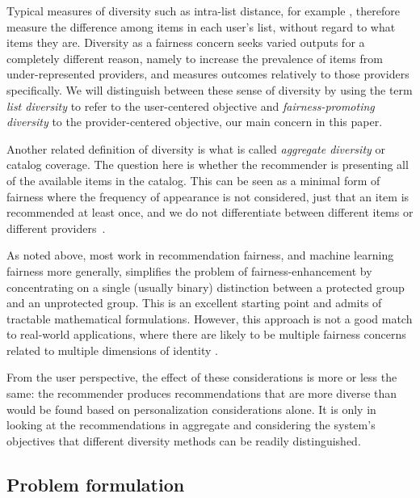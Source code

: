 Typical measures of diversity such as intra-list distance, for example \cite{Ziegler:2005:IRL:1060745.1060754}, therefore measure the difference among items in each user's list, without regard to what items they are. Diversity as a fairness concern seeks varied outputs for a completely different reason, namely to increase the prevalence of items from under-represented providers, and measures outcomes relatively to those providers specifically. We will distinguish between these sense of diversity by using the term \textit{list diversity} to refer to the user-centered objective and \textit{fairness-promoting diversity} to the provider-centered objective, our main concern in this paper.

Another related definition of diversity is what is called \textit{aggregate diversity} or catalog coverage. The question here is whether the recommender is presenting all of the available items in the catalog. This can be seen as a minimal form of fairness where the frequency of appearance is not considered, just that an item is recommended at least once, and we do not differentiate between different items or different providers~\cite{adomavicius2011improving}.

As noted above, most work in recommendation fairness, and machine learning fairness more generally, simplifies the problem of fairness-enhancement by concentrating on a single (usually binary) distinction between a protected group and an unprotected group. This is an excellent starting point and admits of tractable mathematical formulations. However, this approach is not a good match to real-world applications, where there are likely to be multiple fairness concerns related to multiple dimensions of identity \cite{kearns2019empirical}.

From the user perspective, the effect of these considerations is more or less the same: the recommender produces recommendations that are more diverse than would be found based on personalization considerations alone. It is only in looking at the recommendations in aggregate and considering the system's objectives that different diversity methods can be readily distinguished.

\subsection{Problem formulation}
\label{subsec:ofair_prob_formu}

